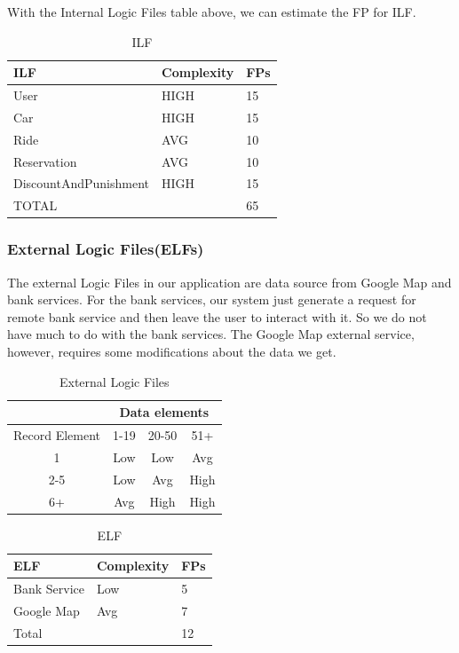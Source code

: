 \documentclass{article}
\begin{document}
    With the Internal Logic Files table above, we can estimate the FP for ILF.
   \begin{table}[h]
   	\centering
   	\caption{ILF}
   	\label{my-label}
   	\begin{tabular}{|l|l|l|}
   		\hline
   		ILF                   & Complexity & FPs \\ \hline
   		User                  & HIGH       & 15  \\ \hline
   		Car                   & HIGH       & 15  \\ \hline
   		Ride                  & AVG        & 10  \\ \hline
   		Reservation           & AVG        & 10  \\ \hline
   		DiscountAndPunishment & HIGH       & 15  \\ \hline
   		\multicolumn{2}{|l|}{TOTAL}        & 65  \\ \hline
   	\end{tabular}
   \end{table}

	\subsubsection{External Logic Files(ELFs)}
	The external Logic Files in our application are data source from Google Map and bank services. For the bank services, our system just generate a request for remote bank service and then leave the user to interact with it. So we do not have much to do with the bank services. The Google Map external service, however, requires some modifications about the data we get. \\
	   	\begin{table}[h!]
		\centering
		\caption{External Logic Files}
		\label{my-label}
		\begin{tabular}{|c|c|c|c|}
			\hline
			& \multicolumn{3}{c|}{Data elements} \\ \hline
			Record Element & 1-19      & 20-50      & 51+       \\ \hline
			1              & Low       & Low        & Avg       \\ \hline
			2-5            & Low       & Avg        & High      \\ \hline
			6+             & Avg       & High       & High      \\ \hline   
		\end{tabular}
	\end{table}

\begin{table}[h]
	\centering
	\caption{ELF}
	\label{my-label}
	\begin{tabular}{|l|l|l|}
		\hline
		ELF           & Complexity  & FPs \\ \hline
		Bank Service  & Low         & 5   \\ \hline
		Google Map    & Avg         & 7   \\ \hline
		\multicolumn{2}{|l|}{Total} & 12  \\ \hline
	\end{tabular}
\end{table}
\end{document}
